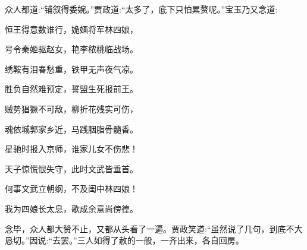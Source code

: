\begin{parag}
    众人都道:“铺叙得委婉。”贾政道:“太多了，底下只怕累赘呢。”宝玉乃又念道:
\end{parag}


\begin{poem}
    \begin{pl}恒王得意数谁行，姽婳将军林四娘，\end{pl}

    \begin{pl}号令秦姬驱赵女，艳李秾桃临战场。\end{pl}

    \begin{pl}绣鞍有泪春愁重，铁甲无声夜气凉。\end{pl}

    \begin{pl}胜负自然难预定，誓盟生死报前王。\end{pl}

    \begin{pl}贼势猖獗不可敌，柳折花残实可伤，\end{pl}

    \begin{pl}魂依城郭家乡近，马践胭脂骨髓香。\end{pl}

    \begin{pl}星驰时报入京师，谁家儿女不伤悲！\end{pl}

    \begin{pl}天子惊慌恨失守，此时文武皆垂首。\end{pl}

    \begin{pl}何事文武立朝纲，不及闺中林四娘！\end{pl}

    \begin{pl}我为四娘长太息，歌成余意尚傍徨。\end{pl}

\end{poem}


\begin{parag}
    念毕，众人都大赞不止，又都从头看了一遍。贾政笑道:“虽然说了几句，到底不大恳切。”因说:“去罢。”三人如得了赦的一般，一齐出来，各自回房。
\end{parag}


